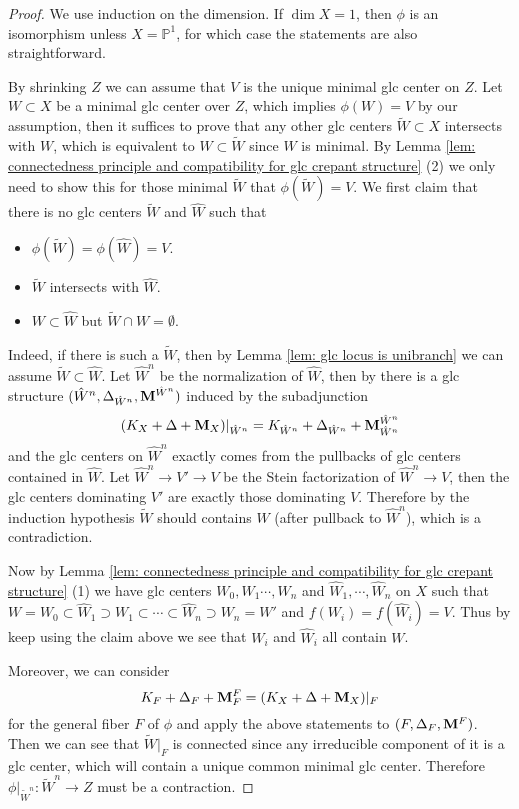 \documentclass[11pt]{amsart}
\numberwithin{equation}{section}
\newcommand{\Mm}{{\bf{M}}}
\newcommand{\Pp}{\mathbb{P}}
\theoremstyle{definition}
\theoremstyle{definition}
\theoremstyle{definition}
\begin{document}
\begin{proof}
We use induction on the dimension. If $\dim X=1$, then $\phi$ is an isomorphism unless $X=\Pp^1$, for which case the statements are also straightforward.

By shrinking $Z$ we can assume that $V$ is the unique minimal glc center on $Z$. Let $W\subset X$ be a minimal glc center over $Z$, which implies $\phi(W)=V$ by our assumption, then it suffices to prove that any other glc centers $\tilde{W}\subset X$ intersects with $W$, which is equivalent to $W\subset\tilde{W}$ since $W$ is minimal. By Lemma \ref{lem: connectedness principle and compatibility for glc crepant structure} (2) we only need to show this for those minimal $\tilde{W}$ that $\phi(\tilde{W})=V$. We first claim that there is no glc centers $\tilde{W}$ and $\hat{W}$ such that
\begin{itemize}
    \item $\phi(\tilde{W})=\phi(\hat{W})=V$.
    \item $\tilde{W}$ intersects with $\hat{W}$.
    \item $W\subset \hat{W}$ but $\tilde{W}\cap W=\emptyset$.
\end{itemize}
Indeed, if there is such a $\tilde{W}$, then by Lemma \ref{lem: glc locus is unibranch} we can assume $\tilde{W}\subset\hat{W}$. Let $\hat{W}^n$ be the normalization of $\hat{W}$, then by \cite[Theorem 1.2]{HL21b} there is a glc structure $(\hat{W}^n,\Delta_{\hat{W}^n},\Mm^{\hat{W}^n})$ induced by the subadjunction 
$$
(K_X+\Delta+\Mm_X)|_{\hat{W}^n}=K_{\hat{W}^n}+\Delta_{\hat{W}^n}+\Mm_{\hat{W}^n}^{\hat{W}^n}
$$
and the glc centers on $\hat{W}^n$ exactly comes from the pullbacks of glc centers contained in $\hat{W}$. Let $\hat{W}^n\to V'\to V$ be the Stein factorization of $\hat{W}^n\to V$, then the glc centers dominating $V'$ are exactly those dominating $V$. Therefore by the induction hypothesis $\tilde{W}$ should contains $W$ (after pullback to $\hat{W}^n$), which is a contradiction. 

Now by Lemma \ref{lem: connectedness principle and compatibility for glc crepant structure} (1) we have glc centers $W_0,W_1\cdots,W_n$ and $\hat{W}_1,\cdots,\hat{W}_n$ on $X$ such that $W=W_0\subset\hat{W}_1\supset W_1\subset\cdots\subset\hat{W}_n\supset W_n=W'$ and $f(W_i)=f(\hat{W}_i)=V$. Thus by keep using the claim above we see that $W_i$ and $\hat{W}_i$ all contain $W$.

Moreover, we can consider
$$
K_F+\Delta_F+\Mm^F_F=(K_X+\Delta+\Mm_X)|_F
$$
for the general fiber $F$ of $\phi$ and apply the above statements to $(F,\Delta_F,\Mm^F)$. Then we can see that $\tilde{W}|_F$ is connected since any irreducible component of it is a glc center, which will contain a unique common minimal glc center. Therefore $\phi|_{\tilde{W}^n}: \tilde{W}^n\to Z$ must be a contraction.
\end{proof}
\end{document}
